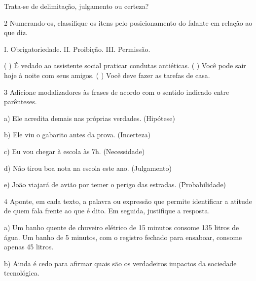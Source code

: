 Trata-se de delimitação, julgamento ou certeza?


\num{2} Numerando-os, classifique os itens pelo posicionamento do
falante em relação ao que diz.

I. Obrigatoriedade. II. Proibição. III. Permissão.

(  ) É vedado ao assistente social praticar condutas
antiéticas. (  ) Você pode sair hoje à noite com seus
amigos. (  ) Você deve fazer as tarefas de casa.

\num{3} Adicione modalizadores às frases de acordo com o sentido
indicado entre parênteses.

a) Ele acredita demais nas próprias verdades. (Hipótese)


b) Ele viu o gabarito antes da prova. (Incerteza)


c) Eu vou chegar à escola às 7h. (Necessidade)


d) Não tirou boa nota na escola este ano. (Julgamento)


e) João viajará de avião por temer o perigo das estradas.
(Probabilidade)


\num{4} Aponte, em cada texto, a palavra ou expressão que permite
identificar a atitude de quem fala frente ao que é dito. Em seguida,
justifique a resposta.

a) Um banho quente de chuveiro elétrico de 15 minutos consome 135 litros
de água. Um banho de 5 minutos, com o registro fechado para ensaboar,
consome apenas 45 litros.


b) Ainda é cedo para afirmar quais são os verdadeiros impactos da
sociedade tecnológica.

